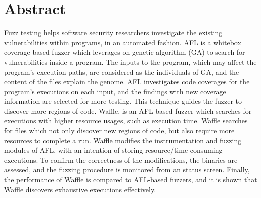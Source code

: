 \doublespacing
\chapter*{Abstract}

Fuzz testing helps software security researchers investigate the existing vulnerabilities within programs, in an automated fashion. AFL is a whitebox coverage-based fuzzer which leverages on genetic algorithm (GA) to search for vulnerabilities inside a program. The inputs to the program, which may affect the program's execution paths, are considered as the individuals of GA, and the content of the files explain the genome. AFL investigates code coverages for the program's executions on each input, and the findings with new coverage information are selected for more testing. This technique guides the fuzzer to discover more regions of code. Waffle, is an AFL-based fuzzer which searches for executions with higher resource usages, such as execution time. Waffle searches for files which not only discover new regions of code, but also require more resources to complete a run. Waffle modifies the instrumentation and fuzzing modules of AFL, with an intention of storing resource/time-consuming executions. To confirm the correctness of the modifications, the binaries are assessed, and the fuzzing procedure is monitored from an status screen. Finally, the performance of Waffle is compared to AFL-based fuzzers, and it is shown that Waffle discovers exhaustive executions effectively.